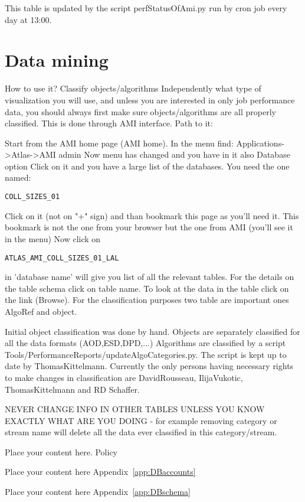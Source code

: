 \documentclass{atlasnote}
\begin{document}
This table is updated by the script perfStatusOfAmi.py run by cron job every day at 13:00.


\section{Data mining}
How to use it?
Classify objects/algorithms
Independently what type of visualization you will use, and unless you are interested in only job performance data, you should always first make sure objects/algorithms are all properly classified. This is done through AMI interface. Path to it:

    Start from the AMI home page (AMI home).
    In the menu find: Applications->Atlas->AMI admin
    Now menu has changed and you have in it also Database option
    Click on it and you have a large list of the databases. You need the one named: \begin{verbatim}COLL_SIZES_01\end{verbatim}
    Click on it (not on "+" sign) and than bookmark this page as you'll need it. This bookmark is not the one from your browser but the one from AMI (you'll see it in the menu)
    Now click on \begin{verbatim}ATLAS_AMI_COLL_SIZES_01_LAL\end{verbatim} in 'database name' will give you list of all the relevant tables. For the details on the table schema click on table name. To look at the data in the table click on the link (Browse). For the classification purposes two table are important ones AlgoRef and object. 

Initial object classification was done by hand. Objects are separately classified for all the data formats (AOD,ESD,DPD,...) Algorithms are classified by a script Tools/PerformanceReports/updateAlgoCategories.py. The script is kept up to date by ThomasKittelmann. Currently the only persons having necessary rights to make changes in classification are DavidRousseau, IlijaVukotic, ThomasKittelmann and RD Schaffer.

NEVER CHANGE INFO IN OTHER TABLES UNLESS YOU KNOW EXACTLY WHAT ARE YOU DOING - for example removing category or stream name will delete all the data ever classified in this category/stream.

Place your content here. Policy~\cite{publication_policy}

Place your content here Appendix~\ref{app:DBaccounts}

Place your content here Appendix~\ref{app:DBschema}
\end{document}
